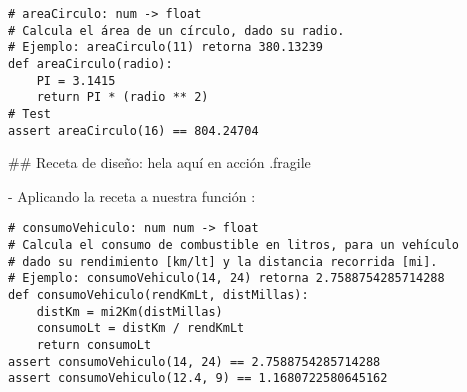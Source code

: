 \begin{lstlisting}[style=frame02]
# areaCirculo: num -> float
# Calcula el área de un círculo, dado su radio.
# Ejemplo: areaCirculo(11) retorna 380.13239
def areaCirculo(radio):
    PI = 3.1415
    return PI * (radio ** 2)
# Test
assert areaCirculo(16) == 804.24704
\end{lstlisting}

## Receta de diseño: hela aquí en acción {.fragile}


- Aplicando la receta a nuestra función :

\begin{lstlisting}[style=frame02]
# consumoVehiculo: num num -> float
# Calcula el consumo de combustible en litros, para un vehículo
# dado su rendimiento [km/lt] y la distancia recorrida [mi].
# Ejemplo: consumoVehiculo(14, 24) retorna 2.7588754285714288
def consumoVehiculo(rendKmLt, distMillas):
    distKm = mi2Km(distMillas)
    consumoLt = distKm / rendKmLt
    return consumoLt
assert consumoVehiculo(14, 24) == 2.7588754285714288
assert consumoVehiculo(12.4, 9) == 1.1680722580645162
\end{lstlisting}

